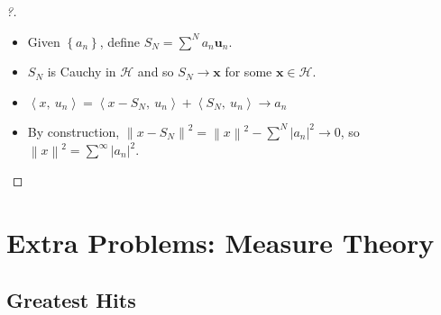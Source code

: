 \begin{proof}[?]

\envlist

\begin{itemize}
\tightlist
\item
  Given \(\left\{{a_{n}}\right\}\), define
  \(S_{N} = \sum^N a_{n} \mathbf{u}_{n}\).
\item
  \(S_{N}\) is Cauchy in \(\mathcal{H}\) and so \(S_{N} \to \mathbf{x}\)
  for some \(\mathbf{x} \in \mathcal{H}\).
\item
  \({\left\langle {x},~{u_{n}} \right\rangle} = {\left\langle {x - S_{N}},~{u_{n}} \right\rangle} + {\left\langle {S_{N}},~{u_{n}} \right\rangle} \to a_{n}\)
\item
  By construction,
  \({\left\lVert {x-S_{N}} \right\rVert}^2 = {\left\lVert {x} \right\rVert}^2 - \sum^N {\left\lvert {a_{n}} \right\rvert}^2 \to 0\),
  so
  \({\left\lVert {x} \right\rVert}^2 = \sum^\infty {\left\lvert {a_{n}} \right\rvert}^2\).
\end{itemize}

\end{proof}

\hypertarget{extra-problems-measure-theory}{%
\section{Extra Problems: Measure
Theory}\label{extra-problems-measure-theory}}

\hypertarget{greatest-hits}{%
\subsection{Greatest Hits}\label{greatest-hits}}

